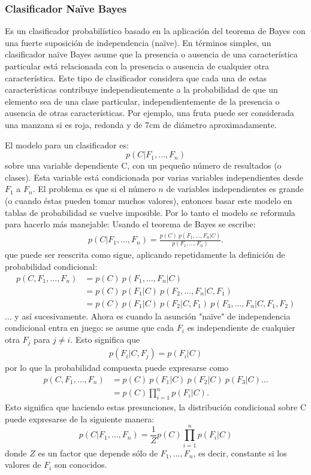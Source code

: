 \subsubsection{Clasificador Na\"{i}ve Bayes}

	Es un clasificador probabilístico basado en la aplicación del teorema de Bayes con una fuerte suposición de independencia (na\"{i}ve). En términos simples, un clasificador na\"{i}ve Bayes asume que la presencia o ausencia de una característica particular está relacionada con la presencia o ausencia de cualquier otra característica. Este tipo de clasificador considera que cada una de estas características contribuye independientemente a la probabilidad de que un elemento sea de una clase particular, independientemente de la presencia o ausencia de otras características. Por ejemplo, una fruta puede ser considerada una manzana si es roja, redonda y de 7cm de diámetro aproximadamente.

	El modelo para un clasificador es:
		$$p(C \vert F_1,\dots,F_n)$$
	sobre una variable dependiente C, con un pequeño número de resultados (o clases). Esta variable está condicionada por varias variables independientes desde $F_1$ a $F_n$. El problema es que si el número $n$ de variables independientes es grande (o cuando éstas pueden tomar muchos valores), entonces basar este modelo en tablas de probabilidad se vuelve imposible. Por lo tanto el modelo se reformula para hacerlo más manejable:
Usando el teorema de Bayes se escribe:
		\begin{align*}
		p(C \vert F_1,\dots,F_n) = \frac{p(C) \ p(F_1,\dots,F_n\vert C)}{p(F_1,\dots,F_n)}.
		\end{align*}
		que puede ser reescrita como sigue, aplicando repetidamente la definición de probabilidad condicional:
		\begin{align}
		p(C, F_1, \dots, F_n)
		&= p(C) \ p(F_1,\dots,F_n\vert C) \\
		&= p(C) \ p(F_1\vert C) \ p(F_2,\dots,F_n\vert C, F_1) \\
		&= p(C) \ p(F_1\vert C) \ p(F_2\vert C, F_1) \ p(F_3,\dots,F_n\vert C, F_1, F_2)
		\end{align}
		... y así sucesivamente. Ahora es cuando la asunción "na\"{i}ve" de independencia condicional entra en juego: se asume que cada $F_i$ es independiente de cualquier otra $F_j$ para $j \neq i$. Esto significa que
		\begin{align*}
		p(F_i \vert C, F_j) = p(F_i \vert C)
		\end{align*}
		por lo que la probabilidad compuesta puede expresarse como
		\begin{align*}
		p(C, F_1, \dots, F_n) 
		&= p(C) \ p(F_1\vert C) \ p(F_2\vert C) \ p(F_3\vert C) \dots \\
		&= p(C) \prod_{i=1}^n p(F_i \vert C).
		\end{align*}
		Esto significa que haciendo estas presunciones, la distribución condicional sobre C puede expresarse de la siguiente manera:
		$$p(C \vert F_1,\dots,F_n) = \frac{1}{Z}p(C)\prod_{i=1}^n p(F_i \vert C)$$
		donde $Z$ es un factor que depende sólo de $F_1,\dots , F_n$, es decir, constante si los valores de $F_i$ son conocidos.
		